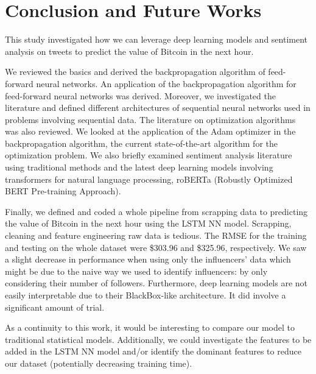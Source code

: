 \chapter{Conclusion and Future Works}

This study investigated how we can leverage deep learning models and sentiment analysis on tweets to predict the value of Bitcoin in the next hour. 

We reviewed the basics and derived the backpropagation algorithm of feed-forward neural networks. An application of the backpropagation algorithm for feed-forward neural networks was derived. Moreover, we investigated the literature and defined different architectures of sequential neural networks used in problems involving sequential data. The literature on optimization algorithms was also reviewed. We looked at the application of the Adam optimizer in the backpropagation algorithm, the current state-of-the-art algorithm for the optimization problem. We also briefly examined sentiment analysis literature using traditional methods and the latest deep learning models involving transformers for natural language processing, roBERTa (Robustly Optimized BERT Pre-training Approach).

Finally, we defined and coded a whole pipeline from scrapping data to predicting the value of Bitcoin in the next hour using the LSTM NN model. Scrapping, cleaning and feature engineering raw data is tedious. The RMSE for the training and testing on the whole dataset were \$303.96 and \$325.96, respectively. We saw a slight decrease in performance when using only the influencers' data which might be due to the naive way we used to identify influencers: by only considering their number of followers. Furthermore, deep learning models are not easily interpretable due to their BlackBox-like architecture. It did involve a significant amount of trial.

As a continuity to this work, it would be interesting to compare our model to traditional statistical models. Additionally, we could investigate the features to be added in the LSTM NN model and/or identify the dominant features to reduce our dataset (potentially decreasing training time).